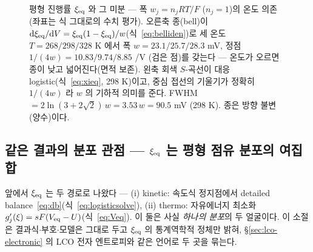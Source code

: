 \begin{figure}[t]
\caption{평형 진행률 $\xi_{\mathrm{eq}}$ 와 그 미분 --- 폭 $w_j{=}n_jRT/F$ ($n_j{=}1$)의 온도 의존(좌표는 식 그대로의
수치 평가). 오른축 종(bell)이 $\mathrm{d}\xi_{\mathrm{eq}}/\mathrm{d} V=\xi_{\mathrm{eq}}(1-\xi_{\mathrm{eq}})/w$(식~\eqref{eq:belliden})로 세 온도
$T{=}268/298/328$ K 에서 폭 $w{=}23.1/25.7/28.3$ mV, 정점 $1/(4w){=}10.83/9.74/8.85$ /V (검은 점)를 갖는다
--- 온도가 오르면 종이 낮고 넓어진다(면적 보존). 왼축 회색 $S$-곡선이 대응 logistic(식~\eqref{eq:xieq}, 298 K)이고,
중심 접선의 기울기가 정확히 $1/(4w)$ 라 $w$ 의 기하적 의미를 준다. FWHM $=2\ln(3{+}2\sqrt2)\,w=3.53\,w=90.5$ mV
(298 K). 종은 방향 불변(양수)이다.}
\label{fig:logistic}
\end{figure}

\subsection{같은 결과의 분포 관점 --- $\xi_{\mathrm{eq}}$ 는 평형 점유 분포의 여집합}\label{sec:dist}
앞에서 $\xi_{\mathrm{eq}}$ 는 두 경로로 나왔다 --- (i) kinetic: 속도식 정지점에서 detailed balance~\eqref{eq:db}(식~\eqref{eq:logisticsolve}),
(ii) thermo: 자유에너지 최소화 $g_j'(\xi)=sF(V_{\mathrm{eq}}-U)$(식~\eqref{eq:Veq}). 이 둘은 사실 \emph{하나의 분포}의 두 얼굴이다.
이 소절은 결과식$\cdot$부호$\cdot$모델은 그대로 두고 $\xi_{\mathrm{eq}}$ 의 통계역학적 정체만 밝혀,
\S\ref{sec:lco-electronic} 의 LCO 전자 엔트로피와 같은 언어로 두 곳을 묶는다.


